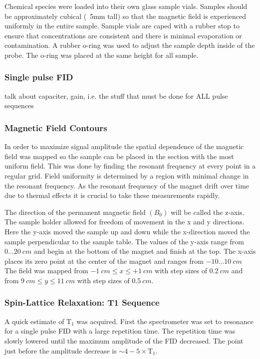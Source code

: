 \documentclass[
reprint,
amsmath,amssymb,
aps,
tikz,
border=5pt
]{revtex4-1}
\begin{document}
    Chemical species were loaded into their own glass sample vials. Samples should be approximately cubical (~5mm tall) so that the magnetic field is experienced uniformly in the entire sample. Sample vials are caped with a rubber stop to ensure that concentrations are consistent and there is minimal evaporation or contamination. A rubber o-ring was used to adjust the sample depth inside of the probe. The o-ring was placed at the same height for all sample. 


\subsubsection*{Single pulse FID}
    talk about capaciter, gain, i.e. the stuff that must be done for ALL pulse sequences
\subsubsection*{Magnetic Field Contours}

    In order to maximize signal amplitude the spatial dependence of the magnetic field was mapped so the sample can be placed in the section with the most uniform field. This was done by finding the resonant frequency at every point in a regular grid. Field uniformity is determined by a region with minimal change in the resonant frequency. As the resonant frequency of the magnet drift over time due to thermal effects it is crucial to take these measurements rapidly. 
    
    The direction of the permanent magnetic field $(B_0)$ will be called the z-axis. The sample holder allowed for freedom of movement in the x and y directions. Here the y-axis moved the sample up and down while the x-direction moved the sample perpendicular to the sample table. The values of the y-axis range from $0\ldots20~cm$ and begin at the bottom of the magnet and finish at the top. The x-axis places its zero point at the center of the magnet and ranges from $-10\ldots10~cm$ The field was mapped from $-1~cm \leq x \leq +1~cm$ with step sizes of $0.2~cm$ and from $9~cm \leq y \leq 11~cm$ with step sizes of $0.5~cm$. 

\subsubsection*{Spin-Lattice Relaxation: T1 Sequence}
    A quick estimate of T$_1$ was acquired. First the spectrometer was set to resonance for a single pulse FID with a large repetition time. The repetition time was slowly lowered until the maximum amplitude of the FID decreased. The point just before the amplitude decrease is $\sim 4-5\times$T$_1$.
\end{document}
